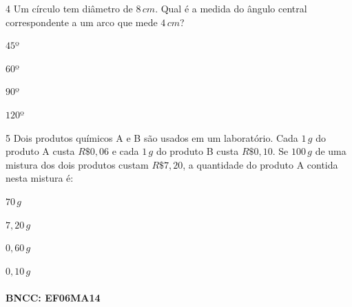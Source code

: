 \num{4}  Um círculo tem diâmetro de $8\,cm$. Qual é a medida do ângulo central
correspondente a um arco que mede $4\,cm$?

\begin{escolha}
\item $45$º
\item $60$º
\item $90$º
\item $120$º
\end{escolha}



\num{5}  Dois produtos químicos A e B são usados em um laboratório. Cada $1\,g$ do
produto A custa $R\$0,06$ e cada $1\,g$ do produto B custa
$R\$0,10$. Se $100\,g$ de uma mistura dos dois produtos custam $R\$7,20$, a
quantidade do produto A contida nesta mistura é:

\begin{escolha}
\item $70\,g$
\item $7,20\,g$
\item $0,60\,g$
\item $0,10\,g$
\end{escolha}

\paragraph{BNCC: EF06MA14 }

